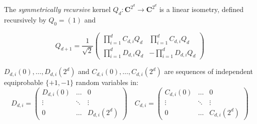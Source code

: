 \documentclass[10pt]{article}
\begin{document}
The \textit{symmetrically recursive} kernel $Q_d:\mathbf{C}^{2^d}\to\mathbf{C}^{2^d}$ is a linear isometry, defined recursively by $Q_0=\left(1\right)$ and

\[
Q_{d+1}=\frac{1}{\sqrt{2}}
\left(
\begin{matrix}
\prod_{i=1}^d C_{d,i} Q_d & \prod_{i=1}^d C_{d,i} Q_d \\
\prod_{i=1}^d D_{d,i} Q_d & -\prod_{i=1}^d D_{d,i} Q_d
\end{matrix}\right)
\]

$D_{d,i}(0),\dots,D_{d,i}(2^d)$ and $C_{d,i}(0),\dots,C_{d,i}(2^d)$ are sequences of independent equiprobable $\{+1,-1\}$ random variables in:
\[
D_{d,i} = \left(
\begin{matrix}
D_{d,i}(0) & \dots & 0 \\
\vdots & \ddots & \vdots \\
0 & \dots & D_{d,i}(2^d)
\end{matrix}\right)
\quad
C_{d,i} = \left(
\begin{matrix}
C_{d,i}(0) & \dots & 0 \\
\vdots & \ddots & \vdots \\
0 & \dots & C_{d,i}(2^d)
\end{matrix}\right)
\]
\end{document}
